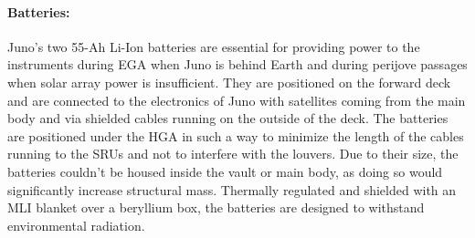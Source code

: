 \paragraph{Batteries:} Juno's two 55-Ah\cite{batteries_info} Li-Ion batteries are essential for providing power to the instruments during EGA when Juno is behind Earth and during perijove passages when solar array power is insufficient.\cite{batterie} They are positioned on the forward deck and are connected to the electronics of Juno with satellites coming from the main body and via shielded cables running on the outside of the deck. The batteries are positioned under the HGA in such a way to minimize the length of the cables running to the SRUs and not to interfere with the louvers.\cite{batteries_position} Due to their size, the batteries couldn't be housed inside the vault or main body, as doing so would significantly increase structural mass. Thermally regulated and shielded with an MLI blanket over a beryllium box, the batteries are designed to withstand environmental radiation.\cite{batteries_position} 

